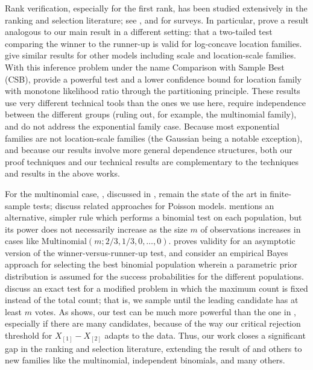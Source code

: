 \documentclass[aos, authoryear]{imsart}
\theoremstyle{definition}
\theoremstyle{custom}
\begin{document}
Rank verification, especially for the first rank, has been studied extensively in the ranking and selection literature; see \citet{Gupta:1971wk, Gupta:1985bj}, and \citet{Hsu:1996} for surveys. In particular, \citet{Gutmann:1987fk} prove a result analogous to our main result in a different setting: that a two-tailed test comparing the winner to the runner-up is valid for log-concave location families. \citet{Bofinger:1991hv, Maymin:1992fz, Karnnan:2009iv} give similar results for other models including scale and location-scale families. With this inference problem under the name Comparison with Sample Best (CSB), \citet{Stefansson:1988wj} provide a powerful test and a lower confidence bound for location family with monotone likelihood ratio through the partitioning principle. These results use very different technical tools than the ones we use here, require independence between the different groups (ruling out, for example, the multinomial family), and do not address the exponential family case. Because most exponential families are not location-scale families (the Gaussian being a notable exception), and because our results involve more general dependence structures, both our proof techniques and our technical results are complementary to the techniques and results in the above works.

For the multinomial case, \citet{Gupta:1967wg}, discussed in , remain the state of the art in finite-sample tests; \citet{Gupta:1976vd} discuss related approaches for Poisson models. \citet{Berger:1980ev} mentions an alternative, simpler rule which performs a binomial test on each population, but its power does not necessarily increase as the size $m$ of observations increases in cases like $\text{Multinomial}(m; 2/3, 1/3, 0, \ldots, 0)$. \citet{Nettleton:2009ht} proves validity for an asymptotic version of the winner-versus-runner-up test, and \citet{Gupta:1989fe} consider an empirical Bayes approach for selecting the best binomial population wherein a parametric prior distribution is assumed for the success probabilities for the different populations. \citet{Ng:2007cn} discuss an exact test for a modified problem in which the maximum count is fixed instead of the total count; that is, we sample until the leading candidate has at least $m$ votes. As  shows, our test can be much more powerful than the one in \citet{Gupta:1967wg}, especially if there are many candidates, because of the way our critical rejection threshold for $X_{[1]} - X_{[2]}$ adapts to the data. Thus, our work closes a significant gap in the ranking and selection literature, extending the result of \citet{Gutmann:1987fk} and others to new families like the multinomial, independent binomials, and many others.
\end{document}

